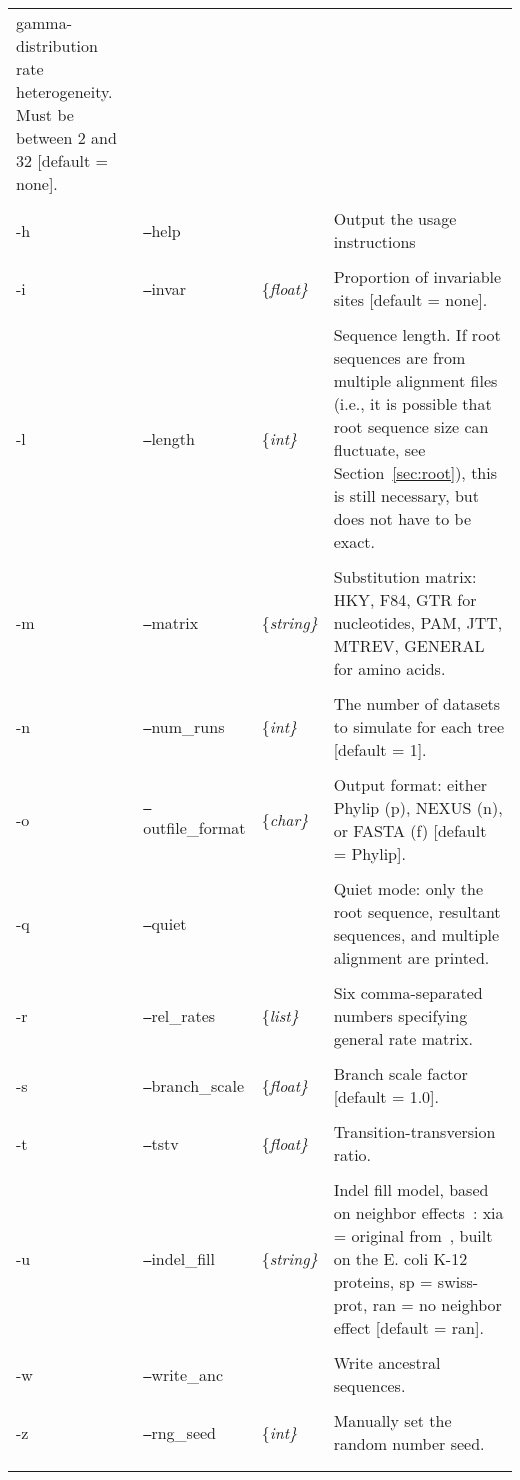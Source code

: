\documentclass[10pt]{article}
\begin{document}
\begin{longtable}{p{0.40in}llp{3in}}
												gamma-distribution rate
												heterogeneity. Must be between 2 and 32
												[default = none]. \\
\\
-h & {\tt --}help & & Output the usage instructions\\
\\
-i & {\tt --}invar & \{\it float\} & Proportion of invariable sites [default = none].\\
\\
-l & {\tt --}length & \{\it int\} & Sequence length.  If root sequences are from multiple
									alignment files (i.e., it is possible that root sequence size
									can fluctuate, see Section~\ref{sec:root}),
									this is still necessary, but does not have to be exact.\\
\\
-m & {\tt --}matrix & \{\it string\} & Substitution matrix: HKY, F84, GTR for nucleotides, PAM,
										JTT, MTREV, GENERAL for amino acids. \\
\\
-n & {\tt --}num\_runs & \{\it int\} & The number of datasets to simulate for each tree
										[default = 1].\\
\\
-o & {\tt --}outfile\_format & \{\it char\} & Output format: either Phylip (p), NEXUS (n), or
												FASTA (f) [default = Phylip]. \\
\\
-q & {\tt --}quiet & & Quiet mode: only the root sequence, resultant sequences, and multiple
							alignment are printed.\\
\\
-r & {\tt --}rel\_rates & \{\it list\} & Six comma-separated numbers specifying general rate matrix.\\
\\
-s & {\tt --}branch\_scale & \{\it float\} & Branch scale factor [default = 1.0].\\
\\
-t & {\tt --}tstv & \{\it float\} & Transition-transversion ratio. \\
\\
-u & {\tt --}indel\_fill & \{\it string\} & Indel fill model, based on neighbor
											effects~\cite{Xia02}: xia = original
											from~\cite{Xia02}, built on the E. coli K-12
											proteins, sp = swiss-prot, ran = no neighbor effect
											[default = ran]. \\
\\
-w & {\tt --}write\_anc & & Write ancestral sequences. \\
\\
-z & {\tt --}rng\_seed & \{\it int\} & Manually set the random number seed.\\
\\
\hline
\label{tab:global}
\end{longtable}
\end{document}
